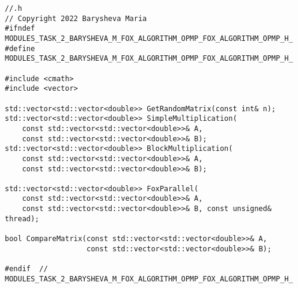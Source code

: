\documentclass[12pt]{article}
\begin{document}
\begin{lstlisting}
//.h
// Copyright 2022 Barysheva Maria
#ifndef MODULES_TASK_2_BARYSHEVA_M_FOX_ALGORITHM_OPMP_FOX_ALGORITHM_OPMP_H_
#define MODULES_TASK_2_BARYSHEVA_M_FOX_ALGORITHM_OPMP_FOX_ALGORITHM_OPMP_H_

#include <cmath>
#include <vector>

std::vector<std::vector<double>> GetRandomMatrix(const int& n);
std::vector<std::vector<double>> SimpleMultiplication(
    const std::vector<std::vector<double>>& A,
    const std::vector<std::vector<double>>& B);
std::vector<std::vector<double>> BlockMultiplication(
    const std::vector<std::vector<double>>& A,
    const std::vector<std::vector<double>>& B);

std::vector<std::vector<double>> FoxParallel(
    const std::vector<std::vector<double>>& A,
    const std::vector<std::vector<double>>& B, const unsigned& thread);

bool CompareMatrix(const std::vector<std::vector<double>>& A,
                   const std::vector<std::vector<double>>& B);

#endif  // MODULES_TASK_2_BARYSHEVA_M_FOX_ALGORITHM_OPMP_FOX_ALGORITHM_OPMP_H_
\end{lstlisting}
\end{document}
